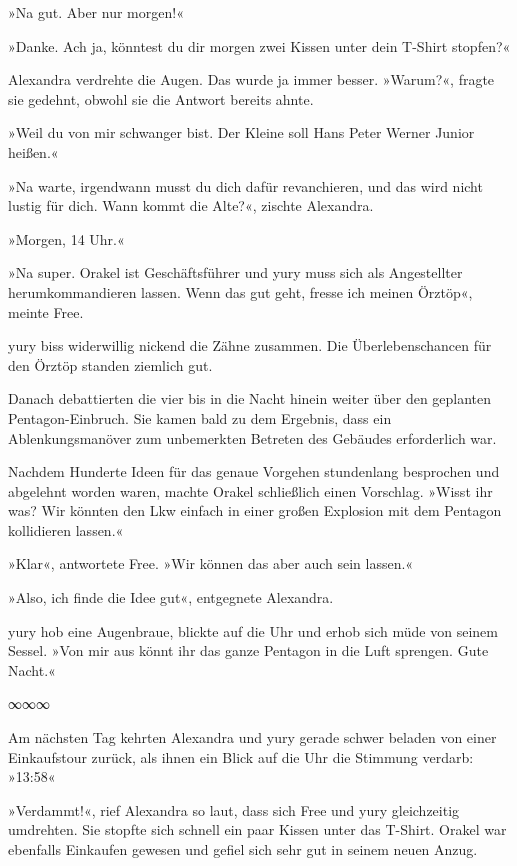 »Na gut. Aber nur morgen!«

»Danke. Ach ja, könntest du dir morgen zwei Kissen unter dein T-Shirt stopfen?«

Alexandra verdrehte die Augen. Das wurde ja immer besser. »Warum?«, fragte sie gedehnt, obwohl sie die Antwort bereits ahnte.

»Weil du von mir schwanger bist. Der Kleine soll Hans Peter Werner Junior heißen.«

»Na warte, irgendwann musst du dich dafür revanchieren, und das wird nicht lustig für dich. Wann kommt die Alte?«, zischte Alexandra.

»Morgen, 14 Uhr.«

»Na super. Orakel ist Geschäftsführer und yury muss sich als Angestellter herumkommandieren lassen. Wenn das gut geht, fresse ich meinen Örztöp«, meinte Free.

yury biss widerwillig nickend die Zähne zusammen. Die Überlebenschancen für den Örztöp standen ziemlich gut.

Danach debattierten die vier bis in die Nacht hinein weiter über den geplanten Pentagon-Einbruch. Sie kamen bald zu dem Ergebnis, dass ein Ablenkungsmanöver zum unbemerkten Betreten des Gebäudes erforderlich war.

Nachdem Hunderte Ideen für das genaue Vorgehen stundenlang besprochen und abgelehnt worden waren, machte Orakel schließlich einen Vorschlag. »Wisst ihr was? Wir könnten den Lkw einfach in einer großen Explosion mit dem Pentagon kollidieren lassen.«

»Klar«, antwortete Free. »Wir können das aber auch sein lassen.«

»Also, ich finde die Idee gut«, entgegnete Alexandra.

yury hob eine Augenbraue, blickte auf die Uhr und erhob sich müde von seinem Sessel. »Von mir aus könnt ihr das ganze Pentagon in die Luft sprengen. Gute Nacht.«

\begin{center}
    ∞∞∞
\end{center}

Am nächsten Tag kehrten Alexandra und yury gerade schwer beladen von einer Einkaufstour zurück, als ihnen ein Blick auf die Uhr die Stimmung verdarb: »13:58«

»Verdammt!«, rief Alexandra so laut, dass sich Free und yury gleichzeitig umdrehten. Sie stopfte sich schnell ein paar Kissen unter das T-Shirt. Orakel war ebenfalls Einkaufen gewesen und gefiel sich sehr gut in seinem neuen Anzug.

